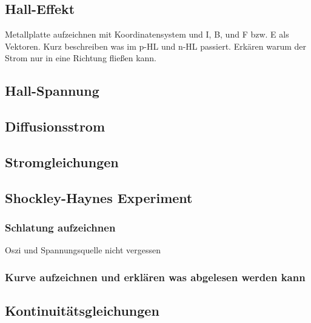 \documentclass{article}
\begin{document}
\subsection{Hall-Effekt }\label{k3:halleffekt}
Metallplatte aufzeichnen mit Koordinatensystem und I, B, und F bzw. E als Vektoren.
Kurz beschreiben was im p-HL und n-HL passiert.
Erk\"aren warum der Strom nur in eine Richtung flie{\ss}en kann.

\subsection{Hall-Spannung }\label{k3:hallspannung}

\subsection{Diffusionsstrom }\label{k3:diffusionsstrom}

\subsection{Stromgleichungen }\label{k3:stromgleichungen}

\subsection{Shockley-Haynes Experiment }\label{k3:shockleyhaynes}
    \subsubsection{Schlatung aufzeichnen} Oszi und Spannungsquelle nicht vergessen
    \subsubsection{Kurve aufzeichnen und erkl\"aren was abgelesen werden kann}

\subsection{Kontinuit\"atsgleichungen }\label{k3:kontinuitaet}
\end{document}
